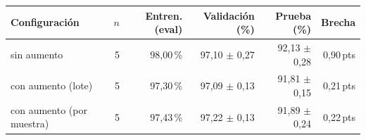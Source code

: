 \begin{tabular}{lrrrrr}
\toprule
Configuración & $n$ & Entren. (eval) & Validación (\%) & Prueba (\%) & Brecha \\
\midrule
sin aumento & 5 & 98,00\,\% & 97,10 $\pm$ 0,27 & 92,13 $\pm$ 0,28 & 0,90\,pts \\
con aumento (lote) & 5 & 97,30\,\% & 97,09 $\pm$ 0,13 & 91,81 $\pm$ 0,15 & 0,21\,pts \\
con aumento (por muestra) & 5 & 97,43\,\% & 97,22 $\pm$ 0,13 & 91,89 $\pm$ 0,24 & 0,22\,pts \\
\bottomrule
\end{tabular}
